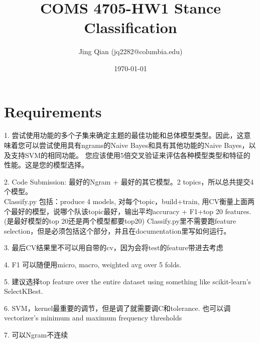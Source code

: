 \documentclass{article}
\title{COMS 4705-HW1 Stance Classification}
\author{Jing Qian (jq2282@columbia.edu)}
\date{\today}
\begin{document}
\maketitle

\section*{Requirements}
1. 尝试使用功能的多个子集来确定主题的最佳功能和总体模型类型。因此，这意味着您可以尝试使用具有ngrams的Naive Bayes和具有其他功能的Naive Bayes，以及支持SVM的相同功能。 
您应该使用5倍交叉验证来评估各种模型类型和特征的性能。这是您的模型选择。 

2. Code Submission: 最好的Ngram + 最好的其它模型。2 topics，所以总共提交4个模型。\\
Classify.py 包括：produce 4 models, 对每个topic，build+train, 用CV衡量上面两个最好的模型，说哪个队该topic最好，输出平均accuracy + F1+top 20 features. (是最好模型的top 20还是两个模型都要top20)
Classify.py里不需要跑feature selection，但是必须包括这个部分，并且在documentation里写如何运行。

3. 最后CV结果里不可以用自带的cv，因为会将test的feature带进去考虑

4. F1 可以随便用micro, macro, weighted avg over 5 folds.

5. 建议选择top feature  over the entire dataset using something like scikit-learn's SelectKBest.

6. SVM，kernel最重要的调节，但是调了就需要调C和tolerance. 也可以调vectorizer's minimum and maximum frequency thresholds

7. 可以Ngram不连续
\end{document}
